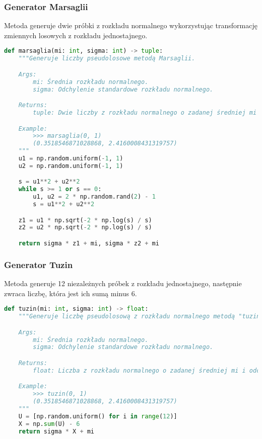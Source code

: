 \documentclass[12pt,letterpaper]{article}
\theoremstyle{definition}
\begin{document}
\subsubsection{Generator Marsaglii}
Metoda generuje dwie próbki z rozkładu normalnego wykorzystując transformację zmiennych losowych z rozkładu jednostajnego.
\begin{lstlisting}[language=Python, caption=Implementacja metody Marsaglii]
def marsaglia(mi: int, sigma: int) -> tuple:
    """Generuje liczby pseudolosowe metodą Marsaglii.

    Args:
        mi: Średnia rozkładu normalnego.
        sigma: Odchylenie standardowe rozkładu normalnego.

    Returns:
        tuple: Dwie liczby z rozkładu normalnego o zadanej średniej mi i odchyleniu standardowym sigma.

    Example:
        >>> marsaglia(0, 1)
        (0.3518546871028868, 2.4160008431319757)
    """
    u1 = np.random.uniform(-1, 1)
    u2 = np.random.uniform(-1, 1)

    s = u1**2 + u2**2
    while s >= 1 or s == 0:
        u1, u2 = 2 * np.random.rand(2) - 1
        s = u1**2 + u2**2

    z1 = u1 * np.sqrt(-2 * np.log(s) / s)
    z2 = u2 * np.sqrt(-2 * np.log(s) / s)

    return sigma * z1 + mi, sigma * z2 + mi
\end{lstlisting}

\subsubsection{Generator Tuzin}
Metoda generuje 12 niezależnych próbek z rozkładu jednostajnego, następnie zwraca liczbę, która jest ich sumą minus 6.
\begin{lstlisting}[language=Python, caption=Implementacja metody Tuzin]
def tuzin(mi: int, sigma: int) -> float:
    """Generuje liczbę pseudolosową z rozkładu normalnego metodą "tuzin".

    Args:
        mi: Średnia rozkładu normalnego.
        sigma: Odchylenie standardowe rozkładu normalnego.

    Returns:
        float: Liczba z rozkładu normalnego o zadanej średniej mi i odchyleniu standardowym sigma.

    Example:
        >>> tuzin(0, 1)
        (0.3518546871028868, 2.4160008431319757)
    """
    U = [np.random.uniform() for i in range(12)]
    X = np.sum(U) - 6
    return sigma * X + mi
\end{lstlisting}
\end{document}
